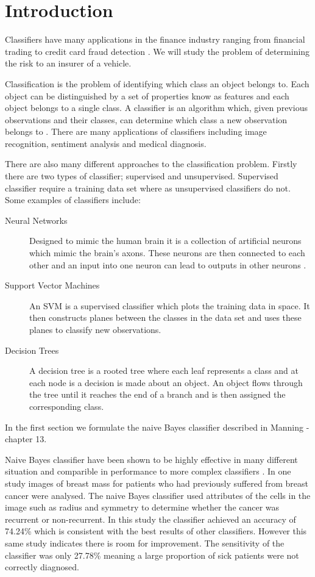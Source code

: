 \chapter{Introduction}

Classifiers have many applications in the finance industry ranging from financial trading \cite{Gerlein16} to credit card fraud detection \cite{Pozzolo15}.
We will study the problem of determining the risk to an insurer of a vehicle.

Classification is the problem of identifying which class an object belongs to.
Each object can be distinguished by a set of properties know as features and each object belongs to a single class.
A classifier is an algorithm which, given previous observations and their classes, can determine which class a new observation belongs to \cite{Theodoridis03}.
There are many applications of classifiers including image recognition, sentiment analysis and medical diagnosis.

There are also many different approaches to the classification problem.
Firstly there are two types of classifier; supervised and unsupervised.
Supervised classifier require a training data set where as unsupervised classifiers do not.
Some examples of classifiers include:
\begin{description}
	\item[Neural Networks] Designed to mimic the human brain it is a collection of artificial neurons which mimic the brain's axons. These neurons are then connected to each other and an input into one neuron can lead to outputs in other neurons \cite{Michie94}.
	\item[Support Vector Machines] An SVM is a supervised classifier which plots the training data in space. It then constructs planes between the classes in the data set and uses these planes to classify new observations.
	\item[Decision Trees] A decision tree is a rooted tree where each leaf represents a class and at each node is a decision is made about an object. An object flows through the tree until it reaches the end of a branch and is then assigned the corresponding class. 
\end{description}

In the first section we formulate the naive Bayes classifier described in Manning \cite{Manning08} - chapter 13.

Naive Bayes classifier have been shown to be highly effective in many different situation and comparible in performance to more complex classifiers \cite{Ashari13}.
In one study \cite{Dumitru09} images of breast mass for patients who had previously suffered from breast cancer were analysed.
The naive Bayes classifier used attributes of the cells in the image such as radius and symmetry to determine whether the cancer was recurrent or non-recurrent.
In this study the classifier achieved an accuracy of 74.24\% which is consistent with the best results of other classifiers.
However this same study indicates there is room for improvement.
The sensitivity of the classifier was only 27.78\% meaning a large proportion of sick patients were not correctly diagnosed.

